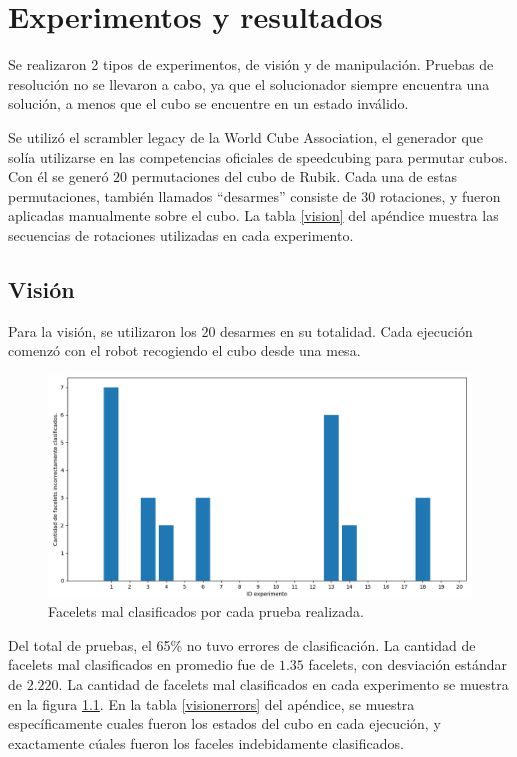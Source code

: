 \chapter{Experimentos y resultados}

Se realizaron 2 tipos de experimentos, de visión y de manipulación. Pruebas de resolución no se llevaron a cabo, ya que el solucionador siempre encuentra una solución, a menos que el cubo se encuentre en un estado inválido.

Se utilizó el scrambler legacy de la World Cube Association, el generador que solía utilizarse en las competencias oficiales de speedcubing para permutar  cubos. Con él se generó $20$ permutaciones del cubo de Rubik. Cada una de estas permutaciones, también llamados ``desarmes'' consiste de $30$ rotaciones, y fueron aplicadas manualmente sobre el cubo. La tabla \ref{vision} del apéndice muestra las secuencias de rotaciones utilizadas en cada experimento.

\section{Visión}
Para la visión, se utilizaron los $20$ desarmes en su totalidad. Cada ejecución comenzó con el robot recogiendo el cubo desde una mesa.

\begin{figure}[h!]
	\centering
	\includegraphics[width=\textwidth]{figures/error_facelet}
	\caption{Facelets mal clasificados por cada prueba realizada.}
	\label{erroresfacelets}
\end{figure}
Del total de pruebas, el 65\% no tuvo errores de clasificación. La cantidad de facelets mal clasificados en promedio fue de $1.35$ facelets, con desviación estándar de $2.220$. La cantidad de facelets mal clasificados en cada experimento se muestra en la figura \ref{erroresfacelets}. En la tabla \ref{visionerrors} del apéndice, se muestra específicamente cuales fueron los estados del cubo en cada ejecución, y exactamente cúales fueron los faceles indebidamente clasificados.

